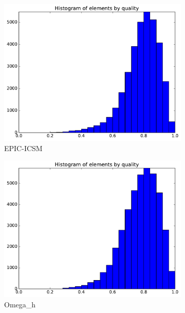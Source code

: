 \documentclass[3p,times,procedia,number]{elsarticle}
\begin{document}
\begin{figure}
\begin{subfigure}{.24\textwidth}
\includegraphics[width=\textwidth]{epic-icsm-cube-cylinder-linear-quality.pdf}
\caption{EPIC-ICSM}
\end{subfigure}
\begin{subfigure}{.24\textwidth}
\centering
\includegraphics[width=\textwidth]{omega_h-cube-cylinder-linear-quality.pdf}
\caption{Omega\_h}
\end{subfigure}
\begin{subfigure}{.24\textwidth}
\centering

\end{subfigure}
\end{figure}
\end{document}
